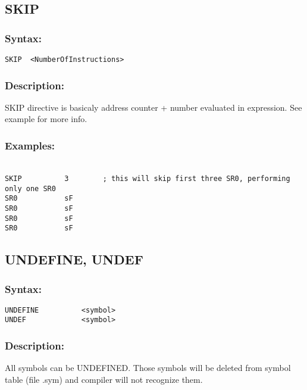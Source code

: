 {    \subsection{SKIP}

        \subsubsection{Syntax:}
            \verb'SKIP  <NumberOfInstructions>'
            
        \subsubsection{Description:}
        SKIP directive is basicaly address counter + number evaluated in expression. See example for more info.
        
        \subsubsection{Examples:}
        {
            ~\\
            \usecodefont
            \verb'SKIP          3        ; this will skip first three SR0, performing only one SR0'\\
            \verb'SR0           sF'\\
            \verb'SR0           sF'\\
            \verb'SR0           sF'\\
            \verb'SR0           sF'\\
        }

    \subsection{UNDEFINE, UNDEF}

        \subsubsection{Syntax:}
        \verb'UNDEFINE          <symbol>'\\
        \verb'UNDEF             <symbol>'
        \subsubsection{Description:}
        All symbols can be UNDEFINED. Those symbols will be deleted from symbol table (file .sym) and compiler will not recognize them.

}

